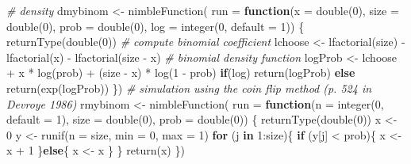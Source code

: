 \documentclass[
  12pt,
]{krantz}
\newenvironment{Shaded}{\begin{snugshade}}{\end{snugshade}}
\newcommand{\AttributeTok}[1]{\textcolor[rgb]{0.77,0.63,0.00}{#1}}
\newcommand{\CommentTok}[1]{\textcolor[rgb]{0.56,0.35,0.01}{\textit{#1}}}
\newcommand{\ControlFlowTok}[1]{\textcolor[rgb]{0.13,0.29,0.53}{\textbf{#1}}}
\newcommand{\DecValTok}[1]{\textcolor[rgb]{0.00,0.00,0.81}{#1}}
\newcommand{\FunctionTok}[1]{\textcolor[rgb]{0.00,0.00,0.00}{#1}}
\newcommand{\NormalTok}[1]{#1}
\newcommand{\OtherTok}[1]{\textcolor[rgb]{0.56,0.35,0.01}{#1}}
\newcommand{\SpecialCharTok}[1]{\textcolor[rgb]{0.00,0.00,0.00}{#1}}
\begin{document}
\begin{Shaded}
\begin{Highlighting}[]
\CommentTok{\# density}
\NormalTok{dmybinom }\OtherTok{\textless{}{-}} \FunctionTok{nimbleFunction}\NormalTok{(}
  \AttributeTok{run =} \ControlFlowTok{function}\NormalTok{(}\AttributeTok{x =} \FunctionTok{double}\NormalTok{(}\DecValTok{0}\NormalTok{), }
                 \AttributeTok{size =} \FunctionTok{double}\NormalTok{(}\DecValTok{0}\NormalTok{), }
                 \AttributeTok{prob =} \FunctionTok{double}\NormalTok{(}\DecValTok{0}\NormalTok{), }
                 \AttributeTok{log =} \FunctionTok{integer}\NormalTok{(}\DecValTok{0}\NormalTok{, }\AttributeTok{default =} \DecValTok{1}\NormalTok{)) \{}
    \FunctionTok{returnType}\NormalTok{(}\FunctionTok{double}\NormalTok{(}\DecValTok{0}\NormalTok{))}
    \CommentTok{\# compute binomial coefficient }
\NormalTok{    lchoose }\OtherTok{\textless{}{-}} \FunctionTok{lfactorial}\NormalTok{(size) }\SpecialCharTok{{-}} \FunctionTok{lfactorial}\NormalTok{(x) }\SpecialCharTok{{-}} \FunctionTok{lfactorial}\NormalTok{(size }\SpecialCharTok{{-}}\NormalTok{ x)}
    \CommentTok{\# binomial density function}
\NormalTok{    logProb }\OtherTok{\textless{}{-}}\NormalTok{ lchoose }\SpecialCharTok{+}\NormalTok{ x }\SpecialCharTok{*} \FunctionTok{log}\NormalTok{(prob) }\SpecialCharTok{+}\NormalTok{ (size }\SpecialCharTok{{-}}\NormalTok{ x) }\SpecialCharTok{*} \FunctionTok{log}\NormalTok{(}\DecValTok{1} \SpecialCharTok{{-}}\NormalTok{ prob)}
    \ControlFlowTok{if}\NormalTok{(log) }\FunctionTok{return}\NormalTok{(logProb)}
    \ControlFlowTok{else} \FunctionTok{return}\NormalTok{(}\FunctionTok{exp}\NormalTok{(logProb)) }
\NormalTok{  \})}
\CommentTok{\# simulation using the coin flip method (p. 524 in Devroye 1986)}
\NormalTok{rmybinom }\OtherTok{\textless{}{-}} \FunctionTok{nimbleFunction}\NormalTok{(}
  \AttributeTok{run =} \ControlFlowTok{function}\NormalTok{(}\AttributeTok{n =} \FunctionTok{integer}\NormalTok{(}\DecValTok{0}\NormalTok{, }\AttributeTok{default =} \DecValTok{1}\NormalTok{),}
                 \AttributeTok{size =} \FunctionTok{double}\NormalTok{(}\DecValTok{0}\NormalTok{),}
                 \AttributeTok{prob =} \FunctionTok{double}\NormalTok{(}\DecValTok{0}\NormalTok{)) \{}
    \FunctionTok{returnType}\NormalTok{(}\FunctionTok{double}\NormalTok{(}\DecValTok{0}\NormalTok{))}
\NormalTok{    x }\OtherTok{\textless{}{-}} \DecValTok{0}
\NormalTok{    y }\OtherTok{\textless{}{-}} \FunctionTok{runif}\NormalTok{(}\AttributeTok{n =}\NormalTok{ size, }\AttributeTok{min =} \DecValTok{0}\NormalTok{, }\AttributeTok{max =} \DecValTok{1}\NormalTok{)}
    \ControlFlowTok{for}\NormalTok{ (j }\ControlFlowTok{in} \DecValTok{1}\SpecialCharTok{:}\NormalTok{size)\{}
      \ControlFlowTok{if}\NormalTok{ (y[j] }\SpecialCharTok{\textless{}}\NormalTok{ prob)\{}
\NormalTok{        x }\OtherTok{\textless{}{-}}\NormalTok{ x }\SpecialCharTok{+} \DecValTok{1}
\NormalTok{      \}}\ControlFlowTok{else}\NormalTok{\{}
\NormalTok{        x }\OtherTok{\textless{}{-}}\NormalTok{ x}
\NormalTok{      \}}
\NormalTok{    \}}
    \FunctionTok{return}\NormalTok{(x)    }
\NormalTok{  \})}
\end{Highlighting}
\end{Shaded}
\end{document}
